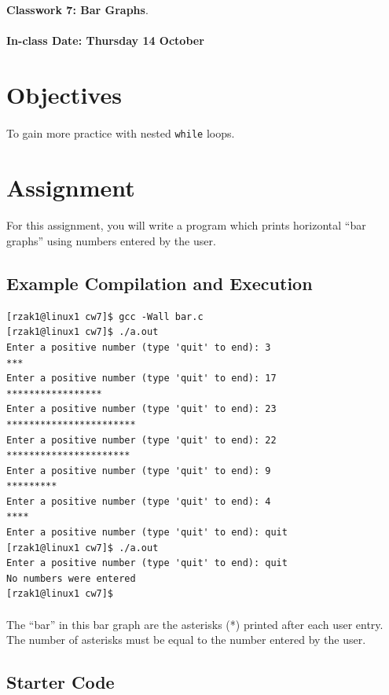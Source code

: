 \documentclass[letter,11pt]{article}
\begin{document}
\huge
\textbf{Classwork 7: Bar Graphs}.
\normalsize
\\ ~~ \\
\textbf{In-class Date: Thursday 14 October}

\section*{Objectives}
\paragraph{}To gain more practice with nested \texttt{while} loops.

\section*{Assignment}
\paragraph{}For this assignment, you will write a program which prints horizontal ``bar graphs'' using numbers entered by the user.

\subsection*{Example Compilation and Execution}
\begin{verbatim}
[rzak1@linux1 cw7]$ gcc -Wall bar.c
[rzak1@linux1 cw7]$ ./a.out
Enter a positive number (type 'quit' to end): 3
***
Enter a positive number (type 'quit' to end): 17
*****************
Enter a positive number (type 'quit' to end): 23
***********************
Enter a positive number (type 'quit' to end): 22
**********************
Enter a positive number (type 'quit' to end): 9
*********
Enter a positive number (type 'quit' to end): 4
****
Enter a positive number (type 'quit' to end): quit
[rzak1@linux1 cw7]$ ./a.out
Enter a positive number (type 'quit' to end): quit
No numbers were entered
[rzak1@linux1 cw7]$
\end{verbatim}

\paragraph{}The ``bar'' in this bar graph are the asterisks (*) printed after each user entry. The number of asterisks must be equal to the number entered by the user.

\subsection*{Starter Code}
\end{document}
